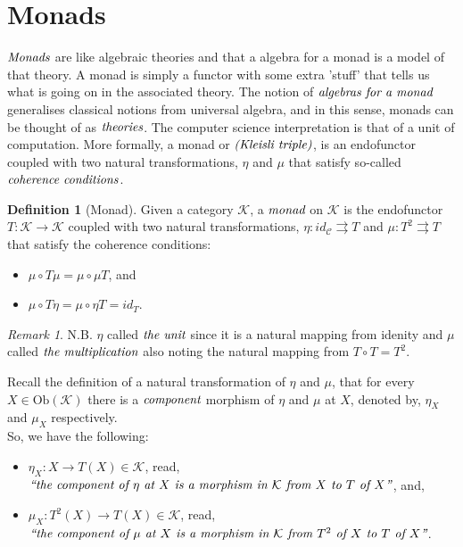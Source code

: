 \documentclass[10pt, oneside, reqno]{amsart}
\theoremstyle{plain}%
\theoremstyle{definition}
\newtheorem{defn}[thm]{Definition}
\theoremstyle{remark}
\newtheorem*{rem}{Remark}
\newcommand{\Id}{\mathit{id}_}
\begin{document}
\section{Monads} %
\label{sec:monads}
$\emph{Monads}$ are like algebraic theories and that a algebra for a monad is a model of that theory. A monad is simply a functor
with some extra 'stuff' that tells us what is going on in the associated theory.
The notion of $\emph{algebras for a monad}$ generalises classical notions from universal algebra,
and in this sense, monads can be thought of as $\emph{theories}$. The computer science interpretation is that of a unit of computation.
More formally, a monad or $\emph{(Kleisli triple)}$, is an endofunctor coupled with two natural transformations,
$\eta$ and $\mu$ that satisfy so-called $\emph{coherence conditions}$.

\begin{defn}[Monad]
 Given a category $\mathcal{K}$, a $\emph{monad}$ on $\mathcal{K}$ is the endofunctor $T: \mathcal{K} \to \mathcal{K}$
 coupled with two natural transformations, $\eta: \Id{\mathcal{C}} \rightrightarrows T$ and $\mu: T^2 \rightrightarrows T$
 that satisfy the coherence conditions:
 \begin{itemize}
  \item $\mu \circ T \mu = \mu \circ \mu T$, and
  \item $\mu \circ T \eta = \mu \circ \eta T = \Id{T}$.
 \end{itemize}
\end{defn}
\begin{rem}
 N.B. $\eta$ called $\emph{the unit}$ since it is a natural mapping from idenity and
 $\mu$ called $\emph{the multiplication}$ also noting the natural mapping from $T \circ T = T^2$.
\end{rem}

Recall the definition of a natural transformation of $\eta$ and $\mu$, that for every $X \in \text{Ob}(\mathcal{K})$
there is a $\emph{component}$ morphism of $\eta$ and $\mu$ at $X$, denoted by, $\eta_{X}$ and $\mu_{X}$ respectively.
\\
So, we have the following:
\begin{itemize}
 \item $\eta_{X}: X \to T(X) \in \mathcal{K}$,
 read, $\emph{``the component of $\eta$ at $X$ is a morphism in $\mathcal{K}$ from $X$ to $T$ of $X$''}$, and,
 \item $\mu_{X}: T^2(X) \to T(X) \in \mathcal{K}$,
 read, $\emph{``the component of $\mu$ at $X$ is a morphism in $\mathcal{K}$ from $T^2$ of $X$ to $T$ of $X$''}$.
\end{itemize}
\end{document}
